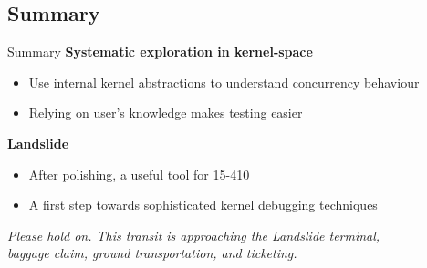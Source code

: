 \documentclass[xcolor=dvipsnames]{beamer}
\begin{document}
\subsection{Summary}
\begin{frame}{Summary}
	\textbf{Systematic exploration in kernel-space}
	\begin{itemize}
		\item Use internal kernel abstractions to understand concurrency behaviour
		\item Relying on user's knowledge makes testing easier
	\end{itemize}
	\linegap
	\textbf{Landslide}
	\begin{itemize}
		\item After polishing, a useful tool for 15-410
		\item A first step towards sophisticated kernel debugging techniques
	\end{itemize}

	\linegap
	\linegap
	\begin{center}
	{\scriptsize \em Please hold on. This transit is approaching the Landslide terminal, \\baggage claim, ground transportation, and ticketing.}
	\end{center}
\end{frame}

\end{document}
